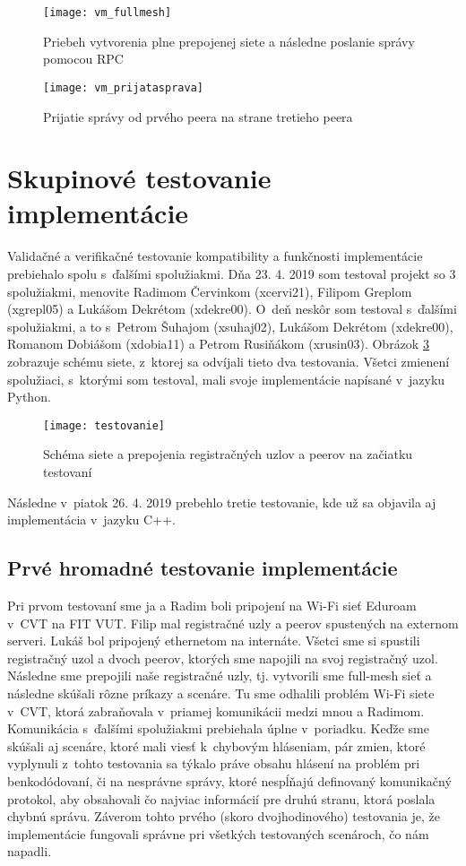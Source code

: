 \begin{figure}[H]
	\texttt{[image: vm\_fullmesh]}
	\caption{Priebeh vytvorenia plne prepojenej siete a následne poslanie správy pomocou RPC}
	\label{vm1}
\end{figure}

\begin{figure}[H]
	\texttt{[image: vm\_prijatasprava]}
	\caption{Prijatie správy  od prvého peera na strane tretieho peera}
	\label{vm2}
\end{figure}

\section{Skupinové testovanie implementácie}

Validačné a verifikačné testovanie kompatibility a funkčnosti implementácie prebiehalo spolu s~ďalšími spolužiakmi. Dňa 23. 4. 2019 som testoval projekt so 3 spolužiakmi, menovite Radimom Červinkom (xcervi21), Filipom Greplom (xgrepl05) a Lukášom Dekrétom (xdekre00). O~deň neskôr som testoval s~ďalšími spolužiakmi, a to s~Petrom Šuhajom (xsuhaj02), Lukášom Dekrétom (xdekre00), Romanom Dobiášom (xdobia11) a Petrom Rusiňákom (xrusin03). Obrázok \ref{schema} zobrazuje schému siete, z~ktorej sa odvíjali tieto dva testovania. Všetci zmienení spolužiaci, s~ktorými som testoval, mali svoje implementácie napísané v~jazyku Python. 

\begin{figure}[H]
	\texttt{[image: testovanie]}
	\caption{Schéma siete a prepojenia registračných uzlov a peerov na začiatku testovaní}
	\label{schema}
\end{figure}


Následne v~piatok 26. 4. 2019 prebehlo tretie testovanie, kde už sa objavila aj implementácia v~jazyku C++.

\subsection{Prvé hromadné testovanie implementácie}

Pri prvom testovaní sme ja a Radim boli pripojení na Wi-Fi sieť Eduroam v~CVT na FIT VUT. Filip mal registračné uzly a peerov spustených na externom serveri. Lukáš bol pripojený ethernetom na internáte. Všetci sme si spustili registračný uzol a dvoch peerov, ktorých sme napojili na svoj registračný uzol. Následne sme prepojili naše registračné uzly, tj. vytvorili sme  full-mesh sieť a následne skúšali rôzne príkazy a scenáre. Tu sme odhalili problém Wi-Fi siete v~CVT, ktorá zabraňovala v~priamej komunikácii medzi mnou a Radimom. Komunikácia s~ďalšími spolužiakmi prebiehala úplne v~poriadku. Keďže sme skúšali aj scenáre, ktoré mali viesť k~chybovým hláseniam, pár zmien, ktoré vyplynuli z~tohto testovania sa týkalo práve obsahu hlásení na problém pri benkodódovaní, či na nesprávne správy, ktoré nespĺňajú definovaný komunikačný protokol, aby obsahovali čo najviac informácií pre druhú stranu, ktorá poslala chybnú správu. Záverom tohto prvého (skoro dvojhodinového) testovania je, že implementácie fungovali správne pri všetkých testovaných scenároch, čo nám napadli.

